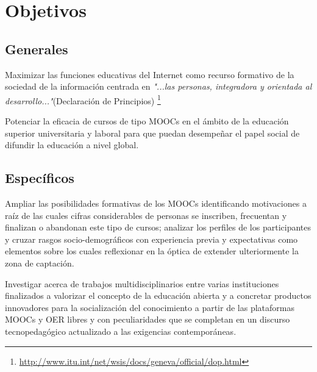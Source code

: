 \documentclass[11pt]{article}
\begin{document}

\section{Objetivos}

\begin{description}

\subsection{Generales}

\item Maximizar las funciones educativas del Internet como recurso formativo de la sociedad de la información centrada en \textit {"...las personas, integradora y orientada al desarrollo..."}(Declaración de Principios) \footnote{\url{http://www.itu.int/net/wsis/docs/geneva/official/dop.html}}

\item Potenciar la eficacia de cursos de tipo MOOCs en el ámbito de la educación superior universitaria y laboral para que puedan desempeñar el papel social de difundir la educación a nivel global.

\subsection{Específicos}
\item Ampliar las posibilidades formativas de los MOOCs identificando motivaciones a raíz de las cuales cifras considerables de personas se inscriben, frecuentan y finalizan o abandonan este tipo de cursos; analizar los perfiles de los participantes y cruzar rasgos socio-demográficos con experiencia previa y expectativas como elementos sobre los cuales reflexionar en la óptica de extender ulteriormente la zona de captación.

\item Investigar acerca de trabajos multidisciplinarios entre varias instituciones finalizados a valorizar el concepto de la educación abierta y a concretar productos innovadores para la socialización del conocimiento a partir de las plataformas MOOCs y OER libres y con peculiaridades que se completan en un discurso tecnopedagógico actualizado a las exigencias contemporáneas.



\end{description}
\end{document}
